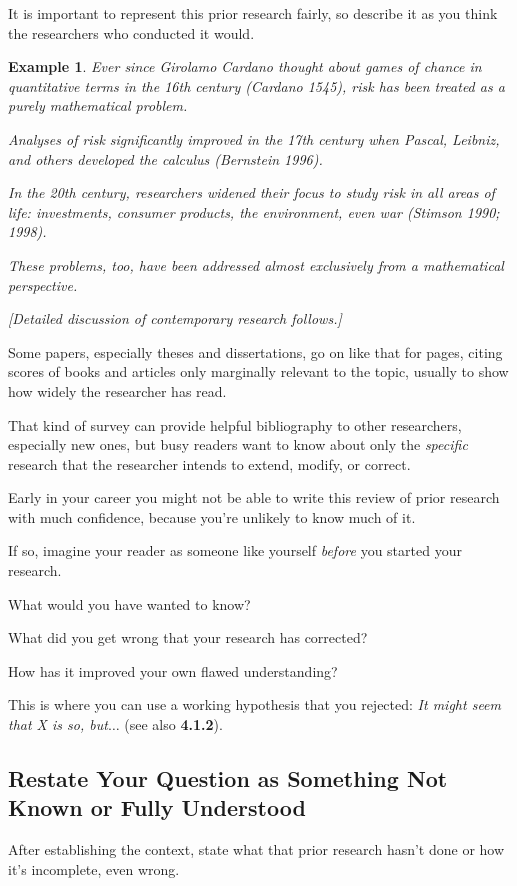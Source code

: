 \documentclass[oneside]{book}
\numberwithin{equation}{section}
\newtheorem{example}{Example}[section]
\begin{document}
It is important to represent this prior research fairly, so describe it as you think the researchers who conducted it would.
\begin{example}
    Ever since Girolamo Cardano thought about games of chance in quantitative terms in the 16th century (Cardano 1545), risk has been treated as a purely mathematical problem.
    
    Analyses of risk significantly improved in the 17th century when Pascal, Leibniz, and others developed the calculus (Bernstein 1996).
    
    In the 20th century, researchers widened their focus to study risk in all areas of life: investments, consumer products, the environment, even war (Stimson 1990; 1998).
    
    These problems, too, have been addressed almost exclusively from a mathematical perspective.
    
    [Detailed discussion of contemporary research follows.]
\end{example}
Some papers, especially theses and dissertations, go on like that for pages, citing scores of books and articles only marginally relevant to the topic, usually to show how widely the researcher has read.

That kind of survey can provide helpful bibliography to other researchers, especially new ones, but busy readers want to know about only the \textit{specific} research that the researcher intends to extend, modify, or correct.

%
Early in your career you might not be able to write this review of prior research with much confidence, because you're unlikely to know much of it.

If so, imagine your reader as someone like yourself \textit{before} you started your research.

What would you have wanted to know?

What did you get wrong that your research has corrected?

How has it improved your own flawed understanding?

This is where you can use a working hypothesis that you rejected: \textit{It might seem that X is so, but$\ldots$} (see also \textbf{4.1.2}).

\subsection{Restate Your Question as Something Not Known or Fully Understood}
After establishing the context, state what that prior research hasn't done or how it's incomplete, even wrong.
\end{document}
